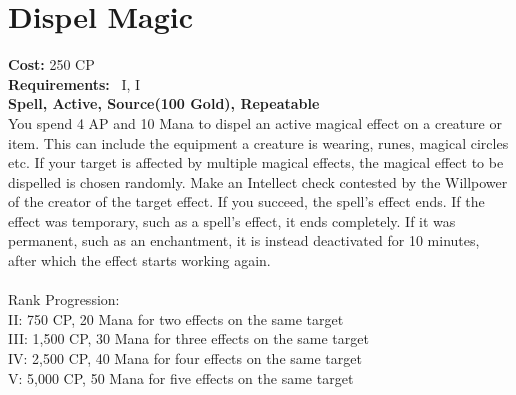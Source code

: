 \section{Dispel Magic}
\textbf{Cost:} 250 CP\\
\textbf{Requirements:}~ I, I\\
\textbf{Spell, Active, Source(100 Gold), Repeatable}\\
You spend 4 AP and 10 Mana to dispel an active magical effect on a creature or item.
This can include the equipment a creature is wearing, runes, magical circles etc.
If your target is affected by multiple magical effects, the magical effect to be dispelled is chosen randomly.
Make an Intellect check contested by the Willpower of the creator of the target effect.
If you succeed, the spell's effect ends.
If the effect was temporary, such as a spell's effect, it ends completely.
If it was permanent, such as an enchantment, it is instead deactivated for 10 minutes, after which the effect starts working again.\\
\\
Rank Progression:\\
II: 750 CP, 20 Mana for two effects on the same target\\
III: 1,500 CP, 30 Mana for three effects on the same target\\
IV: 2,500 CP, 40 Mana for four effects on the same target\\
V: 5,000 CP, 50 Mana for five effects on the same target\\
